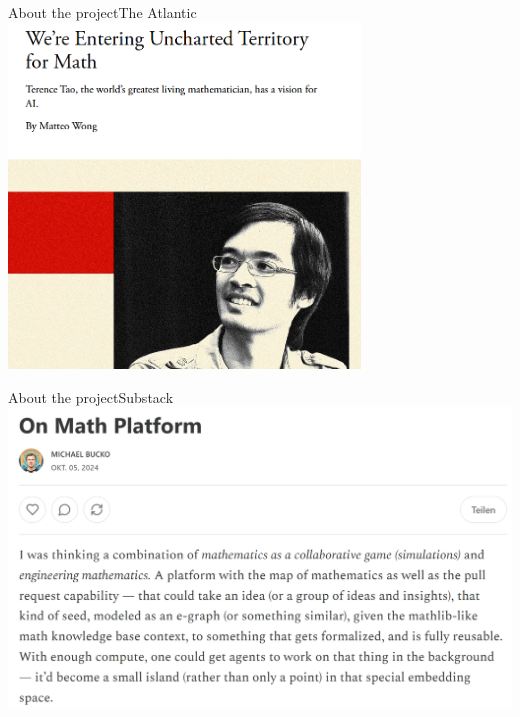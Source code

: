 \documentclass{beamer}
\begin{document}
\begin{frame}{About the project}{The Atlantic}
\includegraphics[width=0.7\textwidth]{atlantic}
\end{frame}


\begin{frame}{About the project}{Substack}
\includegraphics[width=\textwidth]{substack}
\end{frame}
\end{document}
